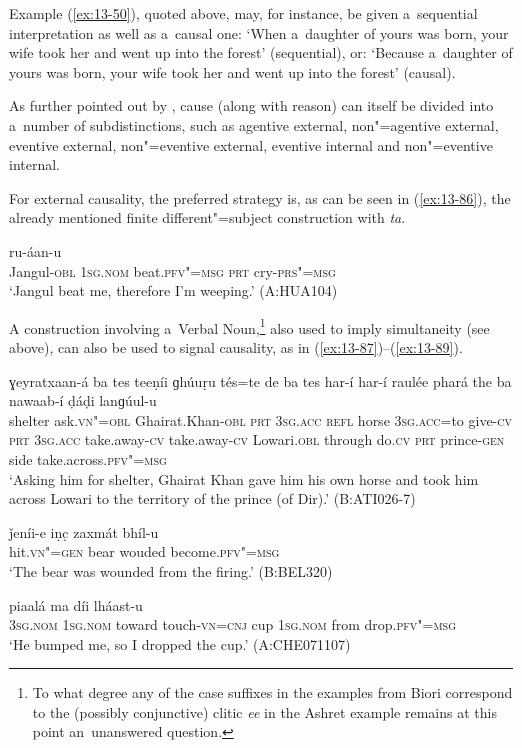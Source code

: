 Example (\ref{ex:13-50}), quoted above, may, for instance, be given a~sequential interpretation as well as a~causal one: `When a~daughter of yours was born, your wife took her and went up into the forest' (sequential), or: `Because a~daughter of yours was born, your wife took her and went up into the forest' (causal).



As further pointed out by \citet[335]{givon2001b}, cause (along with reason) can itself be divided into a~number of subdistinctions, such as agentive external, non"=agentive external, eventive external, non"=eventive external, eventive internal and non"=eventive internal.



For external causality, the preferred strategy is, as can be seen in (\ref{ex:13-86}), the already mentioned finite different"=subject construction with \textit{ta}.

\begin{exe}
\ex
\label{ex:13-86}
 ru-áan-u  \\
Jangul-\textsc{obl} \textsc{1sg.nom} beat.\textsc{pfv"=msg} \textsc{prt} cry-\textsc{prs"=msg}  \\
\glt `Jangul beat me, therefore I'm weeping.' (A:HUA104)
\end{exe}

A construction involving a~Verbal Noun,\footnote{To what degree any of the case suffixes in the examples from Biori correspond to the (possibly conjunctive) clitic \textit{ee} in the Ashret example remains at this point an~unanswered question.} also used to imply simultaneity (see above), can also be used to signal causality, as in (\ref{ex:13-87})--(\ref{ex:13-89}).

\begin{exe}
\ex
\label{ex:13-87}
 ɣeyratxaan-á ba tes teeṇíi ɡhúuṛu tés=te de ba tes har-í har-í raulée phará the ba nawaab-í ḍáḍi lanɡúul-u \\
shelter ask.\textsc{vn"=obl} Ghairat.Khan-\textsc{obl} \textsc{prt} \textsc{3sg.acc} \textsc{refl}  horse \textsc{3sg.acc}=to give-\textsc{cv} \textsc{prt} \textsc{3sg.acc} take.away-\textsc{cv} take.away-\textsc{cv} Lowari.\textsc{obl} through do.\textsc{cv} \textsc{prt} prince-\textsc{gen} side take.across.\textsc{pfv"=msg} \\
\glt `Asking him for shelter, Ghairat Khan gave him his own horse and took him across Lowari to the territory of the prince (of Dir).' (B:ATI026-7)

\ex
\label{ex:13-88}
\gll ǰeníi-e iṇc̣ zaxmát bhíl-u \\
hit.\textsc{vn"=gen} bear wouded become.\textsc{pfv"=msg} \\
\glt `The bear was wounded from the firing.' (B:BEL320)

\ex
\label{ex:13-89}
\gll [so ma pharé ḍhak"=ainíi=ee] piaalá ma díi lháast-u \\
\textsc{3sg.nom} \textsc{1sg.nom} toward touch-\textsc{vn=cnj} cup \textsc{1sg.nom} from drop.\textsc{pfv"=msg}  \\
\glt `He bumped me, so I dropped the cup.' (A:CHE071107) 
\end{exe}

